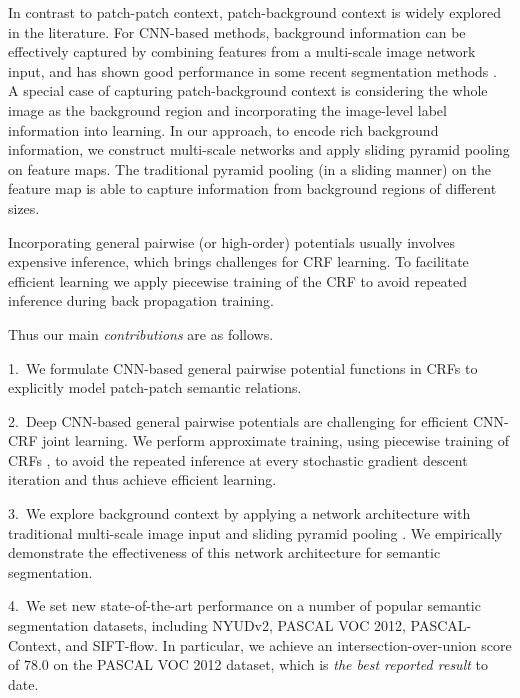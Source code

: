In contrast to patch-patch context,
patch-background context is widely explored in the literature.
For CNN-based methods,
background information can be effectively captured
by combining features from a multi-scale image network input, and has shown good performance
in some recent segmentation methods \cite{farabet2013learning,MostajabiYS14}.
A special case of capturing patch-background context is considering the whole image as the background region and incorporating the image-level label information into learning.
In our approach, to encode rich background information, we construct multi-scale networks and apply sliding pyramid pooling on feature maps.
The traditional pyramid pooling (in a sliding manner) on the feature map is able to capture information from background regions of different sizes.



Incorporating general pairwise (or high-order) potentials usually involves expensive inference, which brings challenges for CRF learning.
To facilitate efficient learning we apply piecewise training of the CRF \cite{SuttonM05} to avoid repeated inference
 during back propagation training.





Thus our main \emph{contributions} are as follows.

  { 1.}~We formulate CNN-based general pairwise potential functions in CRFs to explicitly model patch-patch semantic relations.


  { 2.}~Deep CNN-based general pairwise potentials are challenging for efficient CNN-CRF joint learning.
  We perform approximate training, using piecewise training of CRFs \cite{SuttonM05}, 
  to avoid the repeated inference at every stochastic gradient descent iteration and thus achieve efficient learning.


  {3.}~We explore background context by applying a network architecture with traditional multi-scale image input \cite{farabet2013learning} 
  and sliding pyramid pooling \cite{lazebnik2006beyond}.
   We empirically demonstrate the effectiveness of this network architecture for semantic segmentation.


  {4.}~We set new state-of-the-art performance on a number of popular semantic segmentation datasets, including NYUDv2, PASCAL VOC 2012, PASCAL-Context, and SIFT-flow.
	In particular, we achieve an intersection-over-union score of $78.0$ on the PASCAL VOC 2012 dataset, which is {\em  the  best reported result} to date.






